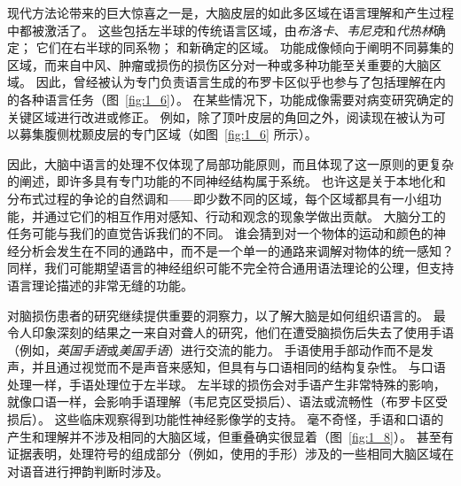 现代方法论带来的巨大惊喜之一是，大脑皮层的如此多区域在语言理解和产生过程中都被激活了。
这些包括左半球的传统语言区域，由\textit{布洛卡}、\textit{韦尼克}和\textit{代热林}确定； 它们在右半球的同系物；
和新确定的区域。
功能成像倾向于阐明不同募集的区域，而来自中风、肿瘤或损伤的损伤区分对一种或多种功能至关重要的大脑区域。
因此，曾经被认为专门负责语言生成的布罗卡区似乎也参与了包括理解在内的各种语言任务（图~\ref{fig:1_6}）。
在某些情况下，功能成像需要对病变研究确定的关键区域进行改进或修正。
例如，除了顶叶皮层的角回之外，阅读现在被认为可以募集腹侧枕颞皮层的专门区域（如图~\ref{fig:1_6} 所示）。


因此，大脑中语言的处理不仅体现了局部功能原则，而且体现了这一原则的更复杂的阐述，即许多具有专门功能的不同神经结构属于系统。
也许这是关于本地化和分布式过程的争论的自然调和——即少数不同的区域，每个区域都具有一小组功能，并通过它们的相互作用对感知、行动和观念的现象学做出贡献。
大脑分工的任务可能与我们的直觉告诉我们的不同。
谁会猜到对一个物体的运动和颜色的神经分析会发生在不同的通路中，而不是一个单一的通路来调解对物体的统一感知？
同样，我们可能期望语言的神经组织可能不完全符合通用语法理论的公理，但支持语言理论描述的非常无缝的功能。


对脑损伤患者的研究继续提供重要的洞察力，以了解大脑是如何组织语言的。
最令人印象深刻的结果之一来自对聋人的研究，他们在遭受脑损伤后失去了使用手语（例如，\textit{英国手语}或\textit{美国手语}）进行交流的能力。
手语使用手部动作而不是发声，并且通过视觉而不是声音来感知，但具有与口语相同的结构复杂性。
与口语处理一样，手语处理位于左半球。 左半球的损伤会对手语产生非常特殊的影响，就像口语一样，会影响手语理解（韦尼克区受损后）、语法或流畅性（布罗卡区受损后）。
这些临床观察得到功能性神经影像学的支持。
毫不奇怪，手语和口语的产生和理解并不涉及相同的大脑区域，但重叠确实很显着（图~\ref{fig:1_8}）。
甚至有证据表明，处理符号的组成部分（例如，使用的手形）涉及的一些相同大脑区域在对语音进行押韵判断时涉及。


